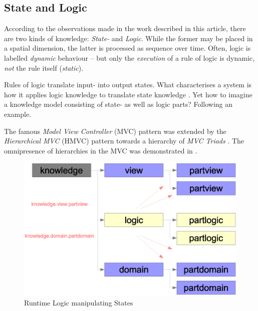 %
%
%
%
%
%
%

\subsection{State and Logic}
\label{state_and_logic_heading}

According to the observations made in the work described in this article, there
are two kinds of knowledge: \emph{State-} and \emph{Logic}. While the former
may be placed in a spatial dimension, the latter is processed as sequence over
time. Often, logic is labelled \emph{dynamic} behaviour -- but only the
\emph{execution} of a rule of logic is dynamic, \emph{not} the rule itself
(\emph{static}).

Rules of logic translate input- into output states. What
characterises a system is how it applies logic knowledge to translate state
knowledge \cite{heller2002}. Yet how to imagine a knowledge model consisting of
state- as well as logic parts? Following an example.

The famous \emph{Model View Controller} (MVC) pattern was extended by the
\emph{Hierarchical MVC} (HMVC) pattern towards a hierarchy of \emph{MVC Triads}
\cite{cai}. The omnipresence of hierarchies in the MVC was demonstrated in
\cite{hellerbohl}.

\begin{figure}[ht]
    \begin{center}
        \includegraphics[scale=0.2]{vector/mvctree.eps}
        \caption{Runtime Logic manipulating States}
        \label{mvctree_figure}
    \end{center}
\end{figure}

